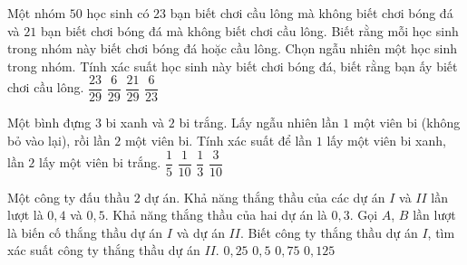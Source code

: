 \begin{ex}%
	Một nhóm $50$ học sinh có $23$ bạn biết chơi cầu lông mà không biết chơi bóng đá và $21$ bạn biết chơi bóng đá mà không biết chơi cầu lông. Biết rằng mỗi học sinh trong nhóm này biết chơi bóng đá hoặc cầu lông. Chọn ngẫu nhiên một học sinh trong nhóm. Tính xác suất học sinh này biết chơi bóng đá, biết rằng bạn ấy biết chơi cầu lông. 
	\choice
	{$\dfrac{23}{29}$}
	{\True$\dfrac{6}{29}$}
	{$\dfrac{21}{29}$}
	{$\dfrac{6}{23}$}
\end{ex}
\begin{ex}%
	Một bình đựng $3$ bi xanh và $2$ bi trắng. Lấy ngẫu nhiên lần $1$ một viên bi (không bỏ vào lại), rồi lần $2$ một viên bi. Tính xác suất để lần $1$ lấy một viên bi xanh, lần $2$ lấy một viên bi trắng.
	\choice
	{$\dfrac{1}{5}$}
	{$\dfrac{1}{10}$}
	{$\dfrac{1}{3}$}
	{\True $\dfrac{3}{10}$}
\end{ex}	
\begin{ex}%
	Một công ty đấu thầu $2$ dự án. Khả năng thắng thầu của các dự án $I$ và $II$ lần lượt là $0{,}4$ và $0{,}5$. Khả năng thắng thầu của hai dự án là $0{,}3$. Gọi $A$, $B$ lần lượt là biến cố thắng thầu dự án $I$ và dự án $II$. Biết công ty thắng thầu dự án $I$, tìm xác suất công ty thắng thầu dự án $II$.
	\choice
	{$0{,}25$}
	{$0{,}5$}
	{\True$0{,}75$}
	{$0{,}125$}
\end{ex}
